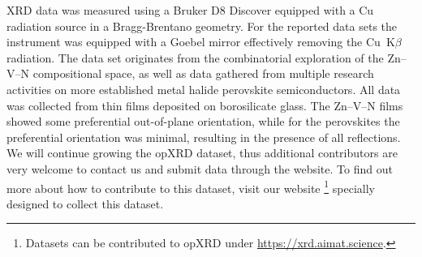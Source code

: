 XRD data was measured using a Bruker D8 Discover equipped with a Cu radiation source in a Bragg-Brentano geometry. For the reported data sets the instrument was equipped with a Goebel mirror effectively removing the Cu~K$\beta$ radiation. The data set originates from the combinatorial exploration of the Zn–V–N compositional space, as well as data gathered from multiple research activities on more established metal halide perovskite semiconductors. All data was collected from thin films deposited on borosilicate glass. The Zn–V–N films showed some preferential out-of-plane orientation, while for the perovskites the preferential orientation was minimal, resulting in the presence of all reflections. \\


We will continue growing the opXRD dataset, thus additional contributors are very welcome to contact us and submit data through the website. To find out more about how to contribute to this dataset, visit our website \footnote{Datasets can be contributed to opXRD under \url{https://xrd.aimat.science}.} specially designed to collect this dataset.